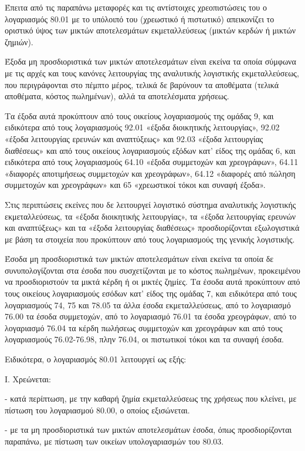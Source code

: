 \documentclass[A4,10pt,greek]{book}
\begin{document}
Έπειτα από τις παραπάνω μεταφορές και τις αντίστοιχες χρεοπιστώσεις του ο λογαριασμός 80.01 με το υπόλοιπό του (χρεωστικό ή πιστωτικό) απεικονίζει το οριστικό ύψος των μικτών αποτελεσμάτων εκμεταλλεύσεως (μικτών κερδών ή μικτών ζημιών).

Έξοδα μη προσδιοριστικά των μικτών αποτελεσμάτων είναι εκείνα τα οποία σύμφωνα με τις αρχές και τους κανόνες λειτουργίας της αναλυτικής λογιστικής εκμεταλλεύσεως, που περιγράφονται στο πέμπτο μέρος, τελικά δε βαρύνουν τα αποθέματα (τελικά αποθέματα, κόστος πωλημένων), αλλά τα αποτελέσματα χρήσεως.

Τα έξοδα αυτά προκύπτουν από τους οικείους λογαριασμούς της ομάδας 9, και ειδικότερα από τους λογαριασμούς 92.01 «έξοδα διοικητικής λειτουργίας», 92.02 «έξοδα λειτουργίας ερευνών και αναπτύξεως» και 92.03 «έξοδα λειτουργίας διαθέσεως» και από τους οικείους λογαριασμούς εξόδων κατ' είδος της ομάδας 6, και ειδικότερα από τους λογαριασμούς 64.10 «έξοδα συμμετοχών και χρεογράφων», 64.11 «διαφορές αποτιμήσεως συμμετοχών και χρεογράφων», 64.12 «διαφορές από πώληση συμμετοχών και χρεογράφων» και 65 «χρεωστικοί τόκοι και συναφή έξοδα».

Στις περιπτώσεις εκείνες που δε λειτουργεί λογιστικό σύστημα αναλυτικής λογιστικής εκμεταλλεύσεως, τα «έξοδα διοικητικής λειτουργίας», τα «έξοδα λειτουργίας ερευνών και αναπτύξεως» και τα «έξοδα λειτουργίας διαθέσεως» προσδιορίζονται εξωλογιστικά με βάση τα στοιχεία που προκύπτουν από τους λογαριασμούς της γενικής λογιστικής.

Έσοδα μη προσδιοριστικά των μικτών αποτελεσμάτων είναι εκείνα τα οποία δε συνυπολογίζονται στα έσοδα που συσχετίζονται με το κόστος πωλημένων, προκειμένου να προσδιοριστούν τα μικτά κέρδη ή οι μικτές ζημίες. Τα έσοδα αυτά προκύπτουν από τους οικείους λογαριασμούς εσόδων κατ' είδος της ομάδας 7, και ειδικότερα από τους λογαριασμούς 74, 75 και 78.05 τα άλλα έσοδα εκμεταλλεύσεως, από το λογαριασμό 76.00 τα έσοδα συμμετοχών, από το λογαριασμό 76.01 τα έσοδα χρεογράφων, από το λογαριασμό 76.04 τα κέρδη πωλήσεως συμμετοχών και χρεογράφων και από τους λογαριασμούς 76.02-76.98, πλην 76.04, οι πιστωτικοί τόκοι και τα συναφή έσοδα.

Ειδικότερα, ο λογαριασμός 80.01 λειτουργεί ως εξής:

Ι. Χρεώνεται:

- κατά περίπτωση, με την καθαρή ζημία εκμεταλλεύσεως της χρήσεως που κλείνει, με πίστωση του λογαριασμού 80.00, ο οποίος εξισώνεται.

- με τα μη προσδιοριστικά των μικτών αποτελεσμάτων έσοδα, όπως προσδιορίζονται παραπάνω, με πίστωση των οικείων υπολογαριασμών του 80.03.
\end{document}
